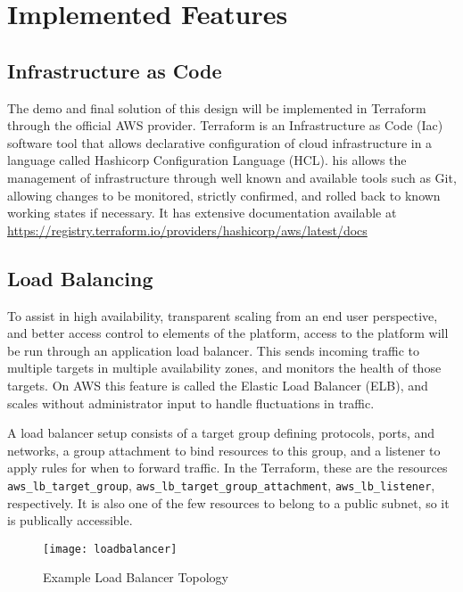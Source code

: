 \section{Implemented Features}

\subsection{Infrastructure as Code}

The demo and final solution of this design will be implemented in Terraform through the official AWS provider. Terraform is an Infrastructure as Code (Iac) software tool that allows declarative configuration of cloud infrastructure in a language called Hashicorp Configuration Language (HCL). his allows the management of infrastructure through well known and available tools such as Git, allowing changes to be monitored, strictly confirmed, and rolled back to known working states if necessary. It has extensive documentation available at \url{https://registry.terraform.io/providers/hashicorp/aws/latest/docs}

\subsection{Load Balancing}

To assist in high availability, transparent scaling from an end user perspective, and better access control to elements of the platform, access to the platform will be run through an application load balancer. This sends incoming traffic to multiple targets in multiple availability zones, and monitors the health of those targets. On AWS this feature is called the Elastic Load Balancer (ELB), and scales without administrator input to handle fluctuations in traffic.

A load balancer setup consists of a target group defining protocols, ports, and networks, a group attachment to bind resources to this group, and a listener to apply rules for when to forward traffic. In the Terraform, these are the resources \texttt{aws\_lb\_target\_group}, \texttt{aws\_lb\_target\_group\_attachment}, \texttt{aws\_lb\_listener}, respectively. It is also one of the few resources to belong to a public subnet, so it is publically accessible.

\begin{figure}[H]\label{fig:loadbalancer}
    \centering
    \texttt{[image: loadbalancer]}
    \caption{Example Load Balancer Topology}
\end{figure}


